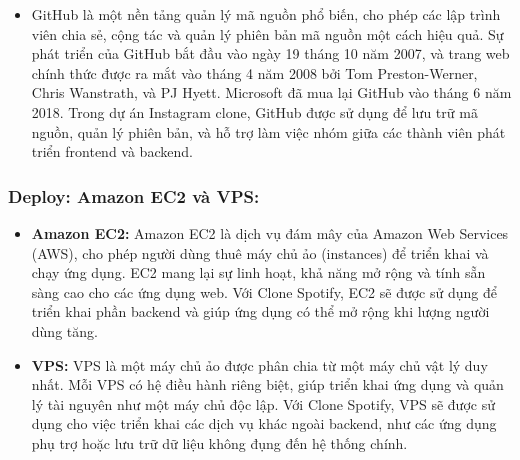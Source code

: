 \begin{itemize}
\item GitHub là một nền tảng quản lý mã nguồn phổ biến, cho phép các lập trình viên chia sẻ, cộng tác và quản lý phiên bản mã nguồn một cách hiệu quả. Sự phát triển của GitHub bắt đầu vào ngày 19 tháng 10 năm 2007, và trang web chính thức được ra mắt vào tháng 4 năm 2008 bởi Tom Preston-Werner, Chris Wanstrath, và PJ Hyett. Microsoft đã mua lại GitHub vào tháng 6 năm 2018. Trong dự án Instagram clone, GitHub được sử dụng để lưu trữ mã nguồn, quản lý phiên bản, và hỗ trợ làm việc nhóm giữa các thành viên phát triển frontend và backend.
\end{itemize}


\subsubsection{ Deploy: Amazon EC2 và VPS:}
\begin{itemize}
    \item \textbf{Amazon EC2:} Amazon EC2 là dịch vụ đám mây của Amazon Web Services (AWS), cho phép người dùng thuê máy chủ ảo (instances) để triển khai và chạy ứng dụng. EC2 mang lại sự linh hoạt, khả năng mở rộng và tính sẵn sàng cao cho các ứng dụng web. Với Clone Spotify, EC2 sẽ được sử dụng để triển khai phần backend và giúp ứng dụng có thể mở rộng khi lượng người dùng tăng.
    \item \textbf{VPS:} VPS là một máy chủ ảo được phân chia từ một máy chủ vật lý duy nhất. Mỗi VPS có hệ điều hành riêng biệt, giúp triển khai ứng dụng và quản lý tài nguyên như một máy chủ độc lập. Với Clone Spotify, VPS sẽ được sử dụng cho việc triển khai các dịch vụ khác ngoài backend, như các ứng dụng phụ trợ hoặc lưu trữ dữ liệu không đụng đến hệ thống chính.
\end{itemize}